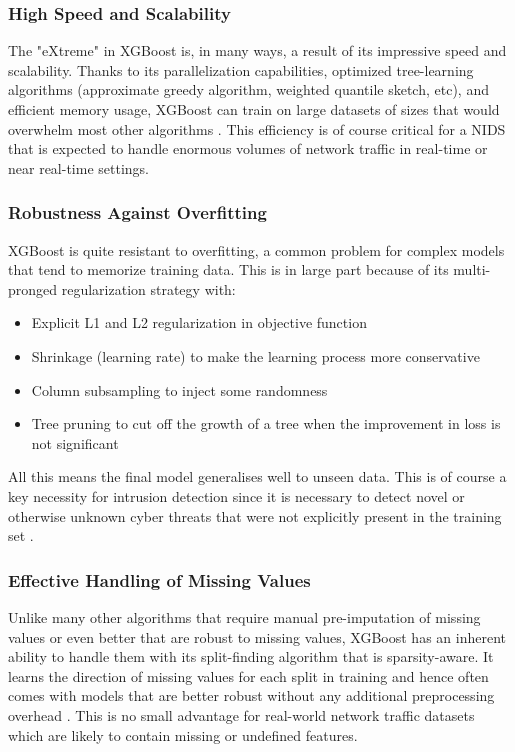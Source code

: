 \subsubsection{High Speed and Scalability} 
The "eXtreme" in XGBoost is, in many ways, a result of its impressive speed and scalability. Thanks to its parallelization capabilities, optimized tree-learning algorithms (approximate greedy algorithm, weighted quantile sketch, etc), and efficient memory usage, XGBoost can train on large datasets of sizes that would overwhelm most other algorithms \parencite{chen2016xgboost}. This efficiency is of course critical for a NIDS that is expected to handle enormous volumes of network traffic in real-time or near real-time settings.

\subsubsection{Robustness Against Overfitting} 
XGBoost is quite resistant to overfitting, a common problem for complex models that tend to memorize training data. This is in large part because of its multi-pronged regularization strategy with:
\begin{itemize}[noitemsep] 
\item Explicit L1 and L2 regularization in objective function
\item Shrinkage (learning rate) to make the learning process more conservative
\item Column subsampling to inject some randomness 
\item Tree pruning to cut off the growth of a tree when the improvement in loss is not significant
\end{itemize} 
All this means the final model generalises well to unseen data. This is of course a key necessity for intrusion detection since it is necessary to detect novel or otherwise unknown cyber threats that were not explicitly present in the training set \parencite{habeeb2024two}.

\subsubsection{Effective Handling of Missing Values} 
Unlike many other algorithms that require manual pre-imputation of missing values or even better that are robust to missing values, XGBoost has an inherent ability to handle them with its split-finding algorithm that is sparsity-aware. It learns the direction of missing values for each split in training and hence often comes with models that are better robust without any additional preprocessing overhead \parencite{al2020survey}. This is no small advantage for real-world network traffic datasets which are likely to contain missing or undefined features.

